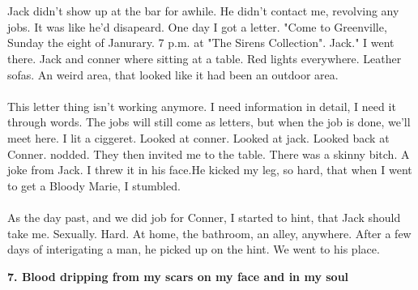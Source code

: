 \documentclass[]{article}
\begin{document}
\\ \\
Jack didn't show up at the bar for awhile. He didn't contact me, revolving any jobs. It was like he'd disapeard. One day I got a letter. "Come to Greenville, Sunday the eight of Janurary. 7 p.m. at "The Sirens Collection". Jack." I went there. Jack and conner where sitting at a table. Red lights everywhere. Leather sofas. An weird area, that looked like it had been an outdoor area. 
\\ \\
This letter thing isn't working anymore. I need information in detail, I need it through words. The jobs will still come as letters, but when the job is done, we'll meet here. I lit a ciggeret. Looked at conner. Looked at jack. Looked back at Conner. nodded. They then invited me to the table. There was a skinny bitch. A joke from Jack. I threw it in his face.He kicked my leg, so hard, that when I went to get a Bloody Marie, I stumbled.
\\ \\
As the day past, and we did job for Conner, I started to hint, that Jack should take me. Sexually. Hard. At home, the bathroom, an alley, anywhere. After a few days of interigating a man, he picked up on the hint. We went to his place. 
\begin{center}
	\large\textbf{7. Blood dripping from my scars \newline on my face and in my soul}
\end{center}
\end{document}
